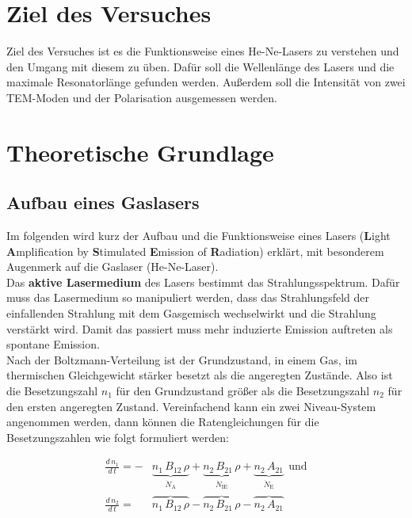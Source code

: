 \section{Ziel des Versuches}
Ziel des Versuches ist es die Funktionsweise eines He-Ne-Lasers zu verstehen und den Umgang mit diesem zu üben. Dafür soll die Wellenlänge des Lasers und die maximale Resonatorlänge gefunden werden. Außerdem soll die Intensität von zwei TEM-Moden und der Polarisation ausgemessen werden.


\section{Theoretische Grundlage}
\subsection{Aufbau eines Gaslasers}
Im folgenden wird kurz der Aufbau und die Funktionsweise eines Lasers (\textbf{L}ight \textbf{A}mplification by \textbf{S}timulated \textbf{E}mission of \textbf{R}adiation) erklärt, mit besonderem Augenmerk auf die Gaslaser (He-Ne-Laser). \\
Das \textbf{aktive Lasermedium} des Lasers bestimmt das Strahlungsspektrum. Dafür muss das Lasermedium so manipuliert werden, dass das Strahlungsfeld der einfallenden Strahlung mit dem Gasgemisch wechselwirkt und die Strahlung verstärkt wird. Damit das passiert muss mehr induzierte Emission auftreten als spontane Emission. \\
Nach der Boltzmann-Verteilung ist der Grundzustand, in einem Gas, im thermischen Gleichgewicht stärker besetzt als die angeregten Zustände. Also ist die Besetzungszahl $n_1$ für den Grundzustand größer als die Besetzungszahl $n_2$ für den ersten angeregten Zustand. Vereinfachend kann ein zwei Niveau-System angenommen werden, dann können die Ratengleichungen für die Besetzungszahlen wie folgt formuliert werden:

\begin{align}
	\frac{d\,n_1}{d\,t} = - &\underbrace{n_1\,B_{12}\,\rho}_{\dot{N}_\text{A}} + \underbrace{n_2\,B_{21}\,\rho}_{\dot{N}_\text{IE}} + \underbrace{n_2\,A_{21}}_{\dot{N}_\text{E}}\ \ \text{und}\\
	\frac{d\,n_2}{d\,t} = \ \ \ &\overbrace{n_1\,B_{12}\,\rho}_{} - \overbrace{n_2\,B_{21}\,\rho}_{} - \overbrace{n_2\,A_{21}}_{}
\end{align}

